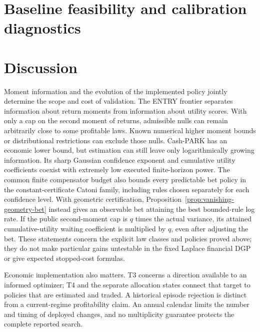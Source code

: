 \documentclass[11pt,a4paper]{article}
\theoremstyle{remark}\newtheorem{remark}[theorem]{Remark}
\begin{document}
\section{Baseline feasibility and calibration diagnostics}
\label{sec:baseline-diagnostic}

\par
{}






\section{Discussion}
Moment information and the evolution of the implemented policy jointly
determine the scope and cost of validation. The ENTRY frontier separates
information about return moments from information about utility scores. With
only a cap on the second moment of returns, admissible nulls can remain
arbitrarily close to some profitable laws. Known numerical higher moment bounds
or distributional restrictions can exclude those nulls. Cash-PARK
has an economic lower bound, but estimation can still leave only logarithmically
growing information. Its sharp Gaussian confidence exponent and cumulative
utility coefficients coexist with extremely low executed finite-horizon power.
The common finite compensator budget also bounds every predictable bet policy
in the constant-certificate Catoni family, including rules chosen separately
for each confidence level.
With geometric certification, Proposition~\ref{prop:vanishing-geometry-bet}
instead gives an observable bet attaining the best bounded-rule log rate.
If the public second-moment cap is $q$ times the actual variance, its attained
cumulative-utility waiting coefficient is multiplied by $q$, even after
adjusting the bet.
These statements concern the explicit law classes and policies proved above;
they do not make particular gains untestable in the fixed Laplace financial DGP
or give expected stopped-cost formulas.

Economic implementation also matters. T3 concerns a direction available to an
informed optimizer; T4 and the separate allocation states connect that target
to policies that are estimated and traded. A historical episode rejection is
distinct from a current-regime profitability claim. An annual calendar limits
the number and timing of deployed changes, and no multiplicity guarantee
protects the complete reported search.
\end{document}
